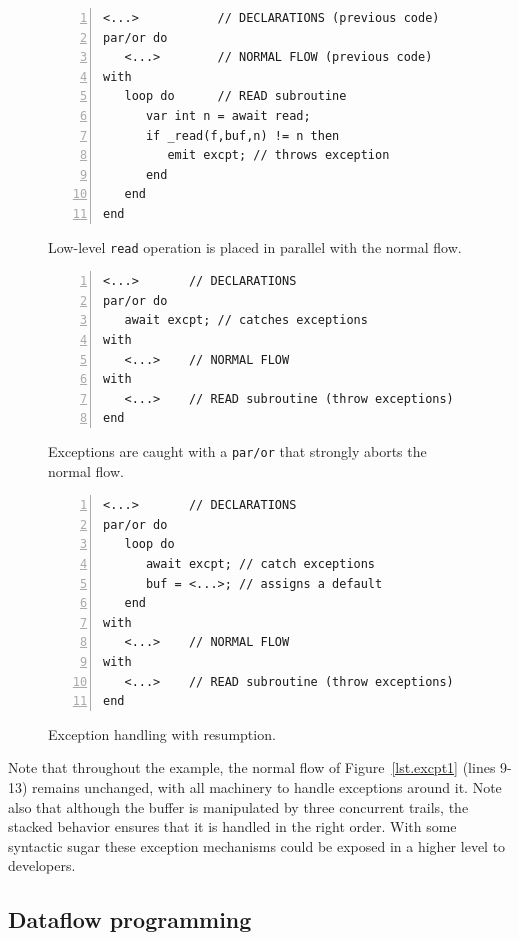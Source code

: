\documentclass{acm_proc_article-sp}
\newcommand{\code}[1] {{\small{\texttt{#1}}}}
\newcommand{\1}{\;}
\newcommand{\2}{\;\;}
\newcommand{\3}{\;\;\;}
\newcommand{\5}{\;\;\;\;\;}
\begin{document}
\begin{figure}[t]
\begin{lstlisting}[numbers=left,xleftmargin=2em]
<...>           // DECLARATIONS (previous code)
par/or do
   <...>        // NORMAL FLOW (previous code)
with
   loop do      // READ subroutine
      var int n = await read;
      if _read(f,buf,n) != n then
         emit excpt; // throws exception
      end
   end
end
\end{lstlisting}
\caption{ Low-level \code{read} operation is placed in parallel with the normal 
flow.
\label{lst.excpt2}
}
\end{figure}

\begin{figure}[t]
\begin{lstlisting}[numbers=left,xleftmargin=2em]
<...>       // DECLARATIONS
par/or do
   await excpt; // catches exceptions
with
   <...>    // NORMAL FLOW
with
   <...>    // READ subroutine (throw exceptions)
end
\end{lstlisting}
\caption{ Exceptions are caught with a \code{par/or} that strongly aborts the 
normal flow.
\label{lst.excpt3}
}
\end{figure}

\begin{figure}[t]
\begin{lstlisting}[numbers=left,xleftmargin=2em]
<...>       // DECLARATIONS
par/or do
   loop do
      await excpt; // catch exceptions
      buf = <...>; // assigns a default
   end
with
   <...>    // NORMAL FLOW
with
   <...>    // READ subroutine (throw exceptions)
end
\end{lstlisting}
\caption{ Exception handling with resumption.
\label{lst.excpt4}
}
\end{figure}

Note that throughout the example, the normal flow of Figure~\ref{lst.excpt1} 
(lines 9-13) remains unchanged, with all machinery to handle exceptions around 
it.
%
Note also that although the buffer is manipulated by three concurrent trails, 
the stacked behavior ensures that it is handled in the right order.
%
With some syntactic sugar these exception mechanisms could be exposed in a 
higher level to developers.

\subsection{Dataflow programming}
\label{sec.adv.frp}
\end{document}
